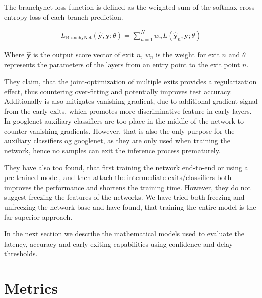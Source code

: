 The \gls{branchynet} loss function is defined as the weighted sum of the softmax cross-entropy loss of each branch-prediction. 

\begin{align}
	L_{\mathrm{BranchyNet}}(\hat{\mathbf{y}},\mathbf{y};\theta) = \sum_{n=1}^{N} w_n L \left(\hat{\mathbf{y}}_{n},\mathbf{y};\theta\right)
\end{align}

Where $ \bm{\hat{y}} $ is the output score vector of exit $ n $, $ w_n $ is the weight for exit $ n $ and $ \theta $ represents the parameters of the layers from an entry point to the exit point $ n $.

They claim, that the joint-optimization of multiple exits provides a regularization effect, thus countering over-fitting and potentially improves test accuracy. Additionally is also mitigates vanishing gradient, due to additional gradient signal from the early exits, which promotes more discriminative feature in early layers. In \gls{googlenet} \cite{szegedy_going_2015} auxiliary classifiers are too place in the middle of the network to counter vanishing gradients. However, that is also the only purpose for the auxiliary classifiers og \gls{googlenet}, as they are only used when training the network, hence no samples can exit the inference process prematurely. 

They have also too found, that first training the network end-to-end or using a pre-trained model, and then attach the intermediate exits/classifiers both improves the performance and shortens the training time. However, they do not suggest freezing the features of the networks. We have tried both freezing and unfreezing the network base and have found, that training the entire model is the far superior approach. 

 In the next section we describe the mathematical models used to evaluate the latency, accuracy and early exiting capabilities using confidence and delay thresholds.

\section{Metrics} \label{sec:ee-metrics}

